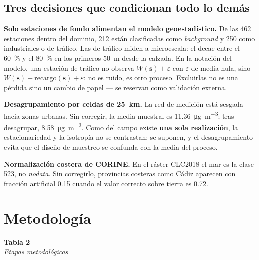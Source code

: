 \documentclass[11pt,a4paper]{article}
\newcommand{\rotulo}[2]{%
  \vspace{4pt}\noindent\textbf{#1}\\[2pt]\emph{#2}\\[4pt]}
\newcommand{\loc}{\bm{s}}
\newcommand{\Wp}[1]{W(#1)}
\begin{document}
\subsection*{Tres decisiones que condicionan todo lo demás}

\textbf{Solo estaciones de fondo alimentan el modelo geoestadístico.} De las
\num{462} estaciones dentro del dominio, \num{212} están clasificadas como
\emph{background} y \num{250} como industriales o de tráfico. Las de tráfico
miden a microescala: el  decae entre el \SI{60}{\percent} y el
\SI{80}{\percent} en los primeros \SI{50}{\metre} desde la calzada. En la
notación del modelo, una estación de tráfico no observa $\Wp{\loc}+\varepsilon$
con $\varepsilon$ de media nula, sino $\Wp{\loc} + \text{recargo}(\loc) +
\varepsilon$: no es ruido, es otro proceso. Excluirlas no es una pérdida sino un
cambio de papel — se reservan como validación externa.

\textbf{Desagrupamiento por celdas de \SI{25}{\kilo\metre}.} La red de medición
está sesgada hacia zonas urbanas. Sin corregir, la media muestral es
\SI{11.36}{\micro\gram\per\cubic\metre}; tras desagrupar,
\SI{8.58}{\micro\gram\per\cubic\metre}. Como del campo existe \textbf{una sola
realización}, la estacionariedad y la isotropía no se contrastan: se suponen, y
el desagrupamiento evita que el diseño de muestreo se confunda con la media del
proceso.

\textbf{Normalización costera de CORINE.} En el ráster CLC2018 el mar es la
clase 523, no \emph{nodata}. Sin corregirlo, provincias costeras como Cádiz
aparecen con fracción artificial \num{0.15} cuando el valor correcto sobre
tierra es \num{0.72}.
\newpage
\section{Metodología}

\rotulo{Tabla 2}{Etapas metodológicas}
\end{document}
